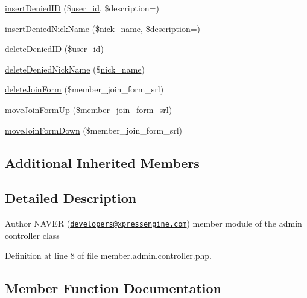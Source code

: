 \begin{DoxyCompactItemize}
\item 
\hyperlink{classmemberAdminController_a568d276708e1c5c4cf47d40741909b1a}{insert\+Denied\+ID} (\$\hyperlink{ko_8install_8php_a74f1a394389d774e5b4cd5d1d15413f7}{user\+\_\+id}, \$description=\textquotesingle{}\textquotesingle{})
\item 
\hyperlink{classmemberAdminController_ad636ff0ef0e9dae33a6592d7fd457bc1}{insert\+Denied\+Nick\+Name} (\$\hyperlink{ko_8install_8php_a151ecae87a1f3d7e257aa089803086bd}{nick\+\_\+name}, \$description=\textquotesingle{}\textquotesingle{})
\item 
\hyperlink{classmemberAdminController_af7f02615adb1cbd7b8b91a330bda1a38}{delete\+Denied\+ID} (\$\hyperlink{ko_8install_8php_a74f1a394389d774e5b4cd5d1d15413f7}{user\+\_\+id})
\item 
\hyperlink{classmemberAdminController_a20792ed4ccef3abf09eb3fbd5dd955fb}{delete\+Denied\+Nick\+Name} (\$\hyperlink{ko_8install_8php_a151ecae87a1f3d7e257aa089803086bd}{nick\+\_\+name})
\item 
\hyperlink{classmemberAdminController_a3fbfbbc1a77c7aaaed901e08fd2ec09c}{delete\+Join\+Form} (\$member\+\_\+join\+\_\+form\+\_\+srl)
\item 
\hyperlink{classmemberAdminController_a6ab62c7dab973a7dc4d12b7739d82660}{move\+Join\+Form\+Up} (\$member\+\_\+join\+\_\+form\+\_\+srl)
\item 
\hyperlink{classmemberAdminController_a07d6306d7ed6eadca11fdc8ca9eb10d4}{move\+Join\+Form\+Down} (\$member\+\_\+join\+\_\+form\+\_\+srl)
\end{DoxyCompactItemize}
\subsection*{Additional Inherited Members}


\subsection{Detailed Description}
\begin{DoxyAuthor}{Author}
N\+A\+V\+ER (\href{mailto:developers@xpressengine.com}{\tt developers@xpressengine.\+com}) member module of the admin controller class 
\end{DoxyAuthor}


Definition at line 8 of file member.\+admin.\+controller.\+php.



\subsection{Member Function Documentation}
\hypertarget{classmemberAdminController_a6e227f85ce71ac94e57e37ecc395613f}{}\label{classmemberAdminController_a6e227f85ce71ac94e57e37ecc395613f} 
